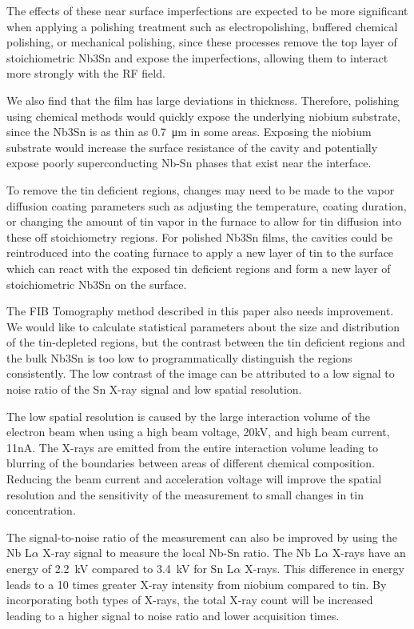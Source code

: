 The effects of these near surface imperfections are expected to be more significant when applying a polishing treatment such as electropolishing, buffered chemical polishing, or mechanical polishing, since these processes remove the top layer of stoichiometric Nb3Sn and expose the imperfections, allowing them to interact more strongly with the RF field. 

We also find that the film has large deviations in thickness. Therefore, polishing using chemical methods would quickly expose the underlying niobium substrate, since the Nb3Sn is as thin as \qty{0.7}{\micro\meter} in some areas. Exposing the niobium substrate would increase the surface resistance of the cavity and potentially expose poorly superconducting Nb-Sn phases that exist near the interface\cite{lee2018atomic}.

To remove the tin deficient regions, changes may need to be made to the vapor diffusion coating parameters such as adjusting the temperature, coating duration, or changing the amount of tin vapor in the furnace to allow for tin diffusion into these off stoichiometry regions. For polished Nb3Sn films, the cavities could be reintroduced into the coating furnace to apply a new layer of tin to the surface which can react with the exposed tin deficient regions and form a new layer of stoichiometric Nb3Sn on the surface.

The FIB Tomography method described in this paper also needs improvement. We would like to calculate statistical parameters about the size and distribution of the tin-depleted regions, but the contrast between the tin deficient regions and the bulk Nb3Sn is too low to programmatically distinguish the regions consistently. The low contrast of the image can be attributed to a low signal to noise ratio of the Sn X-ray signal and low spatial resolution.

The low spatial resolution is caused by the large interaction volume of the electron beam when using a high beam voltage, 20kV, and high beam current, 11nA. The X-rays are emitted from the entire interaction volume leading to blurring of the boundaries between areas of different chemical composition. Reducing the beam current and acceleration voltage will improve the spatial resolution and the sensitivity of the measurement to small changes in tin concentration. 

The signal-to-noise ratio of the measurement can also be improved by using the Nb L$\alpha$ X-ray signal to measure the local Nb-Sn ratio. The Nb L$\alpha$ X-rays have an energy of \qty{2.2}{\kilo\volt} compared to \qty{3.4}{\kilo\volt} for Sn L$\alpha$ X-rays\cite{osti_4794153}. This difference in energy leads to a 10 times greater X-ray intensity from niobium compared to tin. By incorporating both types of X-rays, the total X-ray count will be increased leading to a higher signal to noise ratio and lower acquisition times.


